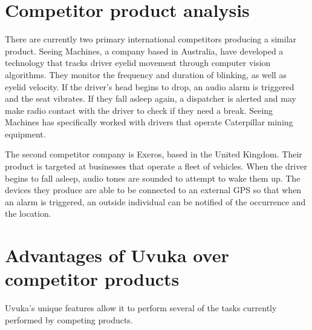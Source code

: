 \section{Competitor product analysis}
There are currently two primary international competitors producing a similar product. Seeing Machines, a company based in Australia, have developed a technology that tracks driver eyelid movement through computer vision algorithms\cite{SeeingMachinesWebsite}. They monitor the frequency and duration of blinking, as well as eyelid velocity. If the driver’s head begins to drop, an audio alarm is triggered and the seat vibrates. If they fall asleep again, a dispatcher is alerted and may make radio contact with the driver to check if they need a break. Seeing Machines has specifically worked with drivers that operate Caterpillar mining equipment\cite{SeeingMachinesWired}.

The second competitor company is Exeros, based in the United Kingdom\cite{Exeros}. Their product is targeted at businesses that operate a fleet of vehicles. When the driver begins to fall asleep, audio tones are sounded to attempt to wake them up. The devices they produce are able to be connected to an external GPS so that when an alarm is triggered, an outside individual can be notified of the occurrence and the location.



\section{Advantages of Uvuka over competitor products} 
Uvuka’s unique features allow it to perform several of the tasks currently performed by competing products.

